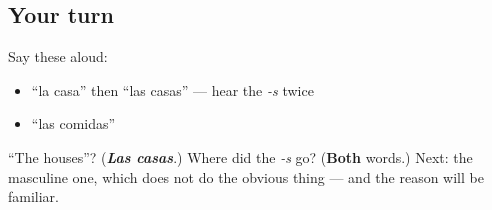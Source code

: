 \subsection*{Your turn}
Say these aloud:

\begin{itemize}
\raggedright
  \item \textquotedblleft{}la casa\textquotedblright{} then \textquotedblleft{}las casas\textquotedblright{} — hear the \emph{-s} twice
  \item \textquotedblleft{}las comidas\textquotedblright{}
\end{itemize}

\begin{tcolorbox}[breakable,colback=teal!4,colframe=teal!35!black,title={Before you move on}]
\textquotedblleft{}The houses\textquotedblright{}? (\emph{\textbf{Las casas}}.) Where did the \emph{-s} go? (\textbf{Both} words.) Next: the masculine one, which does not do the obvious thing — and the reason will be familiar.
\end{tcolorbox}
